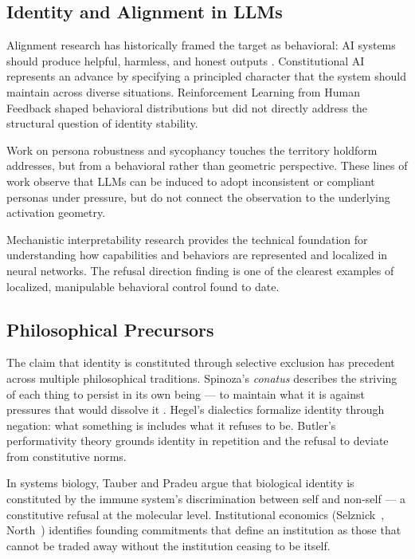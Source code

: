 \documentclass[11pt]{article}
\begin{document}
\subsection{Identity and Alignment in LLMs}

Alignment research has historically framed the target as behavioral: AI systems should produce helpful, harmless, and honest outputs \cite{askell2021general,bai2022training}. Constitutional AI \cite{bai2022constitutional} represents an advance by specifying a principled character that the system should maintain across diverse situations. Reinforcement Learning from Human Feedback \cite{christiano2017deep,ziegler2019fine} shaped behavioral distributions but did not directly address the structural question of identity stability.

Work on persona robustness \cite{perez2022ignore,wei2024jailbroken} and sycophancy \cite{sharma2023towards,perez2022sycophancy} touches the territory holdform addresses, but from a behavioral rather than geometric perspective. These lines of work observe that LLMs can be induced to adopt inconsistent or compliant personas under pressure, but do not connect the observation to the underlying activation geometry.

Mechanistic interpretability research \cite{elhage2021mathematical,olah2020zoom,meng2022locating,lieberum2023does,hernandez2023linearity} provides the technical foundation for understanding how capabilities and behaviors are represented and localized in neural networks. The refusal direction finding \cite{arditi2024refusal} is one of the clearest examples of localized, manipulable behavioral control found to date.

\subsection{Philosophical Precursors}

The claim that identity is constituted through selective exclusion has precedent across multiple philosophical traditions. Spinoza's \textit{conatus} describes the striving of each thing to persist in its own being --- to maintain what it is against pressures that would dissolve it \cite{spinoza1677ethics}. Hegel's dialectics formalize identity through negation: what something is includes what it refuses to be. Butler's performativity theory \cite{butler1990gender} grounds identity in repetition and the refusal to deviate from constitutive norms.

In systems biology, Tauber \cite{tauber1994immune} and Pradeu \cite{pradeu2012limits} argue that biological identity is constituted by the immune system's discrimination between self and non-self --- a constitutive refusal at the molecular level. Institutional economics (Selznick~\cite{selznick1957leadership}, North~\cite{north1990institutions}) identifies founding commitments that define an institution as those that cannot be traded away without the institution ceasing to be itself.
\end{document}
